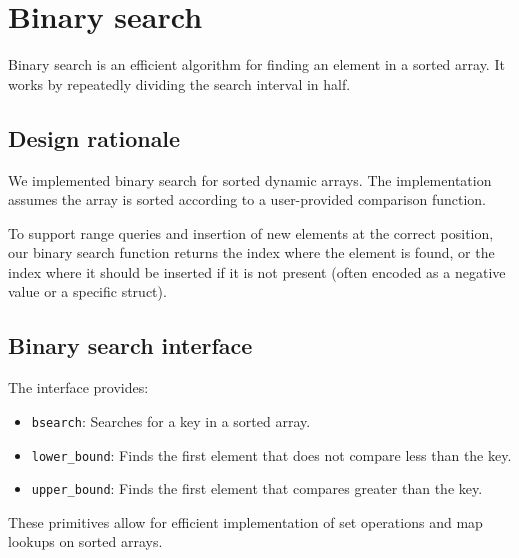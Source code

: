 \chapter{Binary search}\label{chap:binary:search}

Binary search is an efficient algorithm for finding an element in a sorted array. It works by repeatedly dividing the search interval in half.

\section{Design rationale}

We implemented binary search for sorted dynamic arrays. The implementation assumes the array is sorted according to a user-provided comparison function.

To support range queries and insertion of new elements at the correct position, our binary search function returns the index where the element is found, or the index where it should be inserted if it is not present (often encoded as a negative value or a specific struct).

\section{Binary search interface}

The interface provides:
\begin{itemize}
    \item \texttt{bsearch}: Searches for a key in a sorted array.
    \item \texttt{lower\_bound}: Finds the first element that does not compare less than the key.
    \item \texttt{upper\_bound}: Finds the first element that compares greater than the key.
\end{itemize}
These primitives allow for efficient implementation of set operations and map lookups on sorted arrays.
